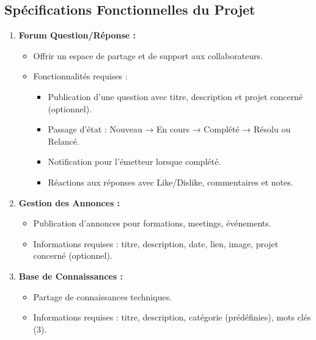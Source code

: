 \documentclass{article}
\begin{document}
        \subsection{Spécifications Fonctionnelles du Projet}
            \begin{enumerate}
                \item \textbf{Forum Question/Réponse :}
                \begin{itemize}
                    \item Offrir un espace de partage et de support aux collaborateurs.
                \item Fonctionnalités requises :
                    \begin{itemize}
                        \item Publication d'une question avec titre, description et projet concerné (optionnel).
                        \item Passage d'état : Nouveau → En cours → Complété → Résolu ou Relancé.
                        \item Notification pour l'émetteur lorsque complété.
                        \item Réactions aux réponses avec Like/Dislike, commentaires et notes.
                    \end{itemize}
                \end{itemize}
                
                \item \textbf{Gestion des Annonces :}
                \begin{itemize}
                    \item Publication d'annonces pour formations, meetings, événements.
                    \item Informations requises : titre, description, date, lien, image, projet concerné (optionnel).
                \end{itemize}
                
                \item \textbf{Base de Connaissances :}
                \begin{itemize}
                    \item Partage de connaissances techniques.
                    \item Informations requises : titre, description, catégorie (prédéfinies), mots clés (3).
                \end{itemize}
                

\end{enumerate}
\end{document}
